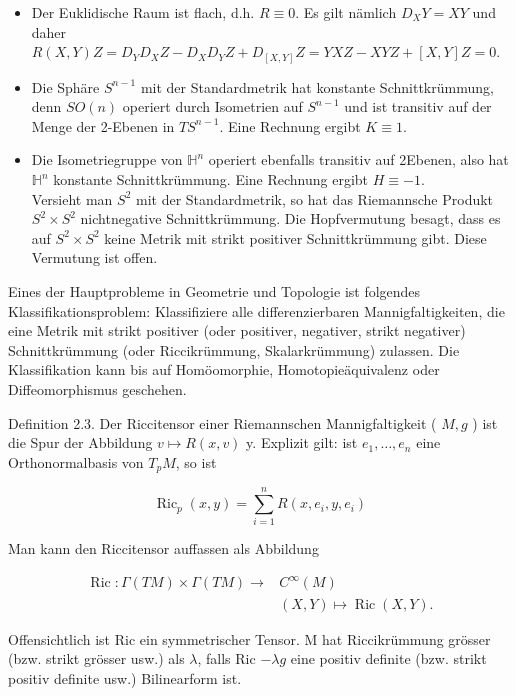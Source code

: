 \documentclass[10pt]{article}
\begin{document}
\begin{itemize}
  \item Der Euklidische Raum ist flach, d.h. $R \equiv 0$. Es gilt nämlich $D_{X} Y=X Y$ und daher\\
$R(X, Y) Z=D_{Y} D_{X} Z-D_{X} D_{Y} Z+D_{[X, Y]} Z=Y X Z-X Y Z+[X, Y] Z=0$.
  \item Die Sphäre $S^{n-1}$ mit der Standardmetrik hat konstante Schnittkrümmung, denn $S O(n)$ operiert durch Isometrien auf $S^{n-1}$ und ist transitiv auf der Menge der 2-Ebenen in $T S^{n-1}$. Eine Rechnung ergibt $K \equiv 1$.
  \item Die Isometriegruppe von $\mathbb{H}^{n}$ operiert ebenfalls transitiv auf 2Ebenen, also hat $\mathbb{H}^{n}$ konstante Schnittkrümmung. Eine Rechnung ergibt $H \equiv-1$.\\
Versieht man $S^{2}$ mit der Standardmetrik, so hat das Riemannsche Produkt $S^{2} \times S^{2}$ nichtnegative Schnittkrümmung. Die Hopfvermutung besagt, dass es auf $S^{2} \times S^{2}$ keine Metrik mit strikt positiver Schnittkrümmung gibt. Diese Vermutung ist offen.
\end{itemize}

Eines der Hauptprobleme in Geometrie und Topologie ist folgendes Klassifikationsproblem: Klassifiziere alle differenzierbaren Mannigfaltigkeiten, die eine Metrik mit strikt positiver (oder positiver, negativer, strikt negativer) Schnittkrümmung (oder Riccikrümmung, Skalarkrümmung) zulassen. Die Klassifikation kann bis auf Homöomorphie, Homotopieäquivalenz oder Diffeomorphismus geschehen.

Definition 2.3. Der Riccitensor einer Riemannschen Mannigfaltigkeit ( $M, g$ ) ist die Spur der Abbildung $v \mapsto R(x, v)$ y. Explizit gilt: ist $e_{1}, \ldots, e_{n}$ eine Orthonormalbasis von $T_{p} M$, so ist

$$
\operatorname{Ric}_{p}(x, y)=\sum_{i=1}^{n} R\left(x, e_{i}, y, e_{i}\right)
$$

Man kann den Riccitensor auffassen als Abbildung

$$
\begin{aligned}
\operatorname{Ric}: \Gamma(T M) \times \Gamma(T M) \rightarrow & C^{\infty}(M) \\
& (X, Y) \mapsto \operatorname{Ric}(X, Y) .
\end{aligned}
$$

Offensichtlich ist Ric ein symmetrischer Tensor. M hat Riccikrümmung grösser (bzw. strikt grösser usw.) als $\lambda$, falls Ric $-\lambda g$ eine positiv definite (bzw. strikt positiv definite usw.) Bilinearform ist.
\end{document}
